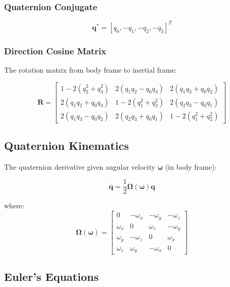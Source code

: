 \documentclass[11pt,a4paper]{article}
\newcommand{\vect}[1]{\bm{#1}}
\newcommand{\mat}[1]{\mathbf{#1}}
\newcommand{\quat}[1]{\mathbf{#1}}
\begin{document}
\subsubsection{Quaternion Conjugate}

\begin{equation}
    \quat{q}^* = [q_0, -q_1, -q_2, -q_3]^T
\end{equation}

\subsubsection{Direction Cosine Matrix}

The rotation matrix from body frame to inertial frame:

\begin{equation}
    \mat{R} = \begin{bmatrix}
        1 - 2(q_2^2 + q_3^2) & 2(q_1 q_2 - q_0 q_3) & 2(q_1 q_3 + q_0 q_2) \\
        2(q_1 q_2 + q_0 q_3) & 1 - 2(q_1^2 + q_3^2) & 2(q_2 q_3 - q_0 q_1) \\
        2(q_1 q_3 - q_0 q_2) & 2(q_2 q_3 + q_0 q_1) & 1 - 2(q_1^2 + q_2^2)
    \end{bmatrix}
\end{equation}

\subsection{Quaternion Kinematics}

The quaternion derivative given angular velocity $\vect{\omega}$ (in body frame):

\begin{equation}
    \dot{\quat{q}} = \frac{1}{2} \mat{\Omega}(\vect{\omega}) \quat{q}
    \label{eq:qdot}
\end{equation}

where:
\begin{equation}
    \mat{\Omega}(\vect{\omega}) = \begin{bmatrix}
        0 & -\omega_x & -\omega_y & -\omega_z \\
        \omega_x & 0 & \omega_z & -\omega_y \\
        \omega_y & -\omega_z & 0 & \omega_x \\
        \omega_z & \omega_y & -\omega_x & 0
    \end{bmatrix}
\end{equation}

\subsection{Euler's Equations}
\end{document}
